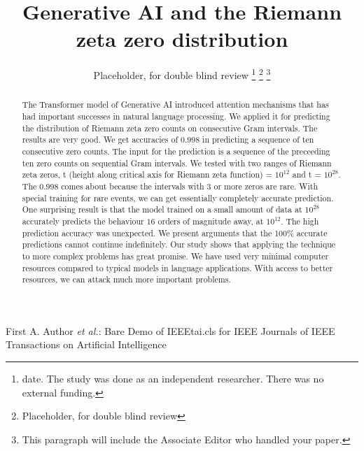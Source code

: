 \documentclass[journal]{IEEEtai}
\begin{document}
\title{Generative AI and the Riemann zeta zero distribution} 


\author{Placeholder, for double blind review
\thanks{ date. The study was done as an independent researcher. There was no
external funding.
 }
\thanks{Placeholder, for double blind review}
\thanks{This paragraph will include the Associate Editor who handled your paper.}}

{First A. Author \MakeLowercase{\textit{et al.}}: Bare Demo of IEEEtai.cls for IEEE Journals of IEEE Transactions on Artificial Intelligence}

\maketitle

\begin{abstract}
The Transformer model of Generative AI introduced attention mechanisms that has had important successes in natural language processing.  We applied it for predicting the distribution of Riemann zeta zero counts on consecutive Gram intervals. The results are very good. We get accuracies of $0.998$ in predicting a sequence of ten consecutive zero counts. The input for the prediction is a sequence of the preceeding ten zero counts on sequential Gram intervals. We tested with two ranges of Riemann zeta zeros, t (height along critical axis for Riemann zeta function) = $10^{12}$ and t = $10^{28}$. The $0.998$ comes about because the intervals with $3$ or more zeros are rare. With special training for rare events, we can get essentially completely accurate prediction. One surprising result is that the model trained on a small amount of data at $10^{28}$ accurately predicts the behaviour $16$ orders of magnitude away, at $10^{12}$. The high prediction accuracy was unexpected. We present arguments that the 100\% accurate predictions cannot continue indefinitely. Our study shows that applying the technique to more complex problems has great promise. We have used very minimal computer resources compared to typical models in language applications. With access to better resources, we can attack much more important problems. 
\end{abstract}
\end{document}
